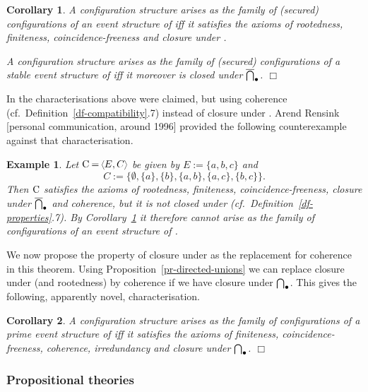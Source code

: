 \documentclass[twocolumn]{article}
\newtheorem{coro}{Corollary}
\newtheorem{exam}{Example}
\newenvironment{corollary}[1]{\begin{coro} \rm \label{cor-#1} }{\end{coro}}
\newenvironment{example}[1]{\begin{exam} \rm \label{ex-#1} }{\end{exam}}
\newcommand{\df}[1]{Definition~\ref{df-#1}}
\newcommand{\pr}[1]{Proposition~\ref{pr-#1}}
\newcommand{\cor}[1]{Corollary~\ref{cor-#1}}
\begin{document}
\begin{corollary}{characterisation-Wi89}
A configuration structure arises as the family of (secured)
configurations of an event structure of \cite{Wi89} iff it satisfies
the axioms of rootedness, finiteness, coincidence-freeness and
closure under .

A configuration structure arises as the family of (secured)
configurations of a stable event structure of \cite{Wi89} iff it
moreover is closed under $\overline{\bigcap}_{\bullet}$.
\hfill $\Box$
\end{corollary}
In \cite{Wi87a} the characterisations above were claimed, but using
coherence (cf.\ \df{compatibility}.7) instead of closure under
.  Arend Rensink [personal communication, around
1996] provided the following counterexample against that characterisation.

\begin{example}{Rensink}
Let $\eC\mathbin{=}\tuple{E,C}$ be given by $E\mathbin{:=}\{a,b,c\}$ and\vspace{-1.4ex}
$$C:=\{\emptyset, \{a\}, \{b\}, \{a,b\}, \{a,c\}, \{b,c\}\}.$$
Then ${\rm C}$ satisfies the axioms of rootedness, finiteness,
coincidence-freeness, closure under $\overline{\bigcap}_{\bullet}$ and coherence, but it
is not closed under  (cf.\ \df{properties}.7). By
\cor{characterisation-Wi89} it therefore cannot arise as the family of
configurations of an event structure of \cite{Wi89}.
\end{example}
We now propose the property of closure under  as the
replacement for coherence in this theorem. Using
\pr{directed-unions} we can replace closure under  (and
rootedness) by coherence if we have closure under $\bigcap_{\bullet}$.
This gives the following, apparently novel, characterisation.

\begin{corollary}{characterisation-prime-Wi89}
A configuration structure arises as the family of configurations of a
prime event structure of \cite{Wi89} iff it satisfies the axioms of
finiteness, coincidence-freeness, coherence, irredundancy and closure
under $\bigcap_{\bullet}$.
\hfill $\Box$
\end{corollary}

\subsubsection*{Propositional theories}
\end{document}

